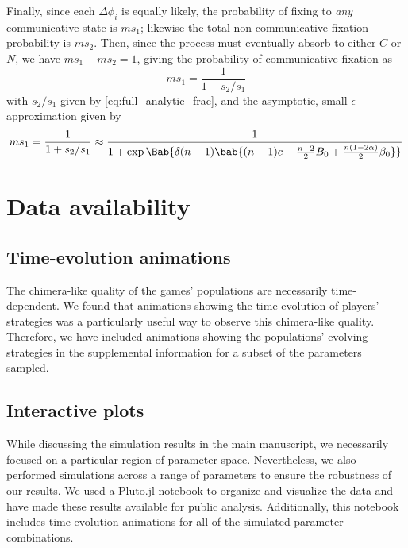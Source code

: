 \documentclass[pdflatex,sn-nature,super]{sn-jnl}
\begin{document}
Finally, since each $\Delta \phi_i$ is equally likely,
the probability of fixing to \emph{any}
communicative state is $m s_1$;
likewise the total non-communicative fixation probability is $m s_2$.
Then, since the process must eventually absorb to either $C$ or $N$,
we have
$m s_1 + m s_2 = 1$, giving the probability of communicative fixation as
\begin{equation}
  m s_1 = \frac{1}{1 + s_2/s_1}
  \label{eq:full_analytic}
\end{equation}
with $s_2/s_1$ given by \cref{eq:full_analytic_frac},
and the asymptotic, small-$\epsilon$ approximation given by
\begin{equation}
  m s_1 = \frac{1}{1 + s_2/s_1}
  \approx
  \frac{1}
  {1 + \exp \Bab{\delta (n-1) \bab{
    (n-1) c
    - \frac{n-2}{2} B_0
    +
    \frac{n (1 - 2 \alpha)}{2} \beta_0
    }}
  }
  \label{eq:analytic_first_term}
\end{equation}

\section{Data availability}
\subsection{Time-evolution animations}
The chimera-like quality of the games' populations
are necessarily time-dependent.
We found that animations showing the time-evolution
of players' strategies was a particularly useful way
to observe this chimera-like quality.
Therefore, we have included animations
showing the populations' evolving strategies
in the supplemental information for a subset of the parameters sampled.

\subsection{Interactive plots}
While discussing the simulation results in the main manuscript,
we necessarily focused on a particular region of parameter space.
Nevertheless, we also performed simulations across a range of parameters
to ensure the robustness of our results.
We used a Pluto.jl notebook to organize and visualize the data
and have made these results available for public analysis.
Additionally, this notebook includes time-evolution animations
for all of the simulated parameter combinations.


\end{document}
